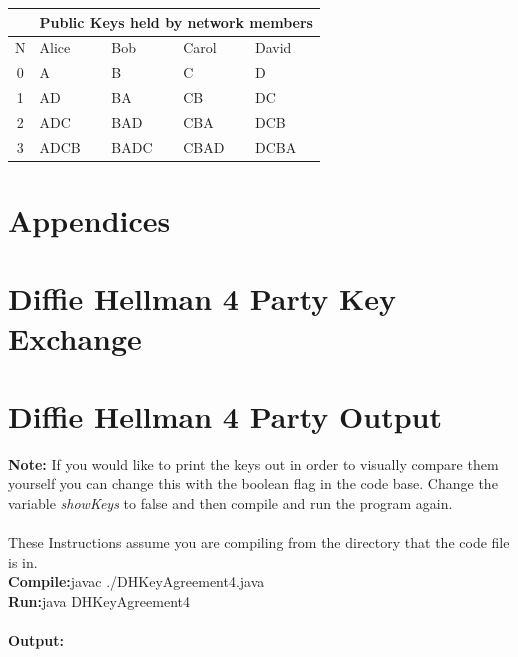 \documentclass[a4paper, twoside, 11pt]{article}
\begin{document}
\begin{center}
	\begin{tabular}{ |c|l|l|l|l| } 
	 \hline
	 \multicolumn{1}{|c|}{}& \multicolumn {4}{|c|}{Public Keys held by network members} \\
	 \hline
   N & Alice & Bob & Carol & David \\
   \hline
   0 & A & B & C & D \\
   1 & AD & BA & CB & DC \\
   2 & ADC & BAD & CBA & DCB \\
   3 & ADCB & BADC & CBAD & DCBA \\
	 \hline
	\end{tabular}
\end{center}

\newpage
\section*{Appendices}
\appendix
\section{Diffie Hellman 4 Party Key Exchange}

\newpage
\section{Diffie Hellman 4 Party Output}
\textbf{Note:} If you would like to print the keys out in order to visually compare them yourself you can change this with the boolean flag in the code base. Change the variable \textit{showKeys} to false and then compile and run the program again. \\
\\
These Instructions assume you are compiling from the directory that the code file is in.\\
\textbf{Compile:}javac ./DHKeyAgreement4.java \\
\textbf{Run:}java DHKeyAgreement4
\\
\\
\textbf{Output:}

\end{document}
